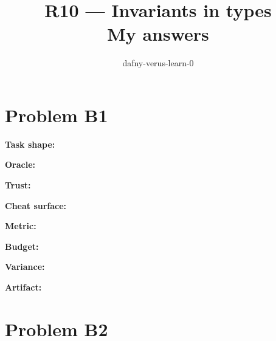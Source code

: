 \documentclass[11pt]{article}
\title{R10 --- Invariants in types \\ \large My answers}
\author{dafny-verus-learn-0}
\date{}
\begin{document}
\maketitle
\section*{Problem B1}\label{ans:B1}
\begin{answer}
\textbf{Task shape:} \vspace{1.3cm}

\textbf{Oracle:} \vspace{1.3cm}

\textbf{Trust:} \vspace{1.3cm}

\textbf{Cheat surface:} \vspace{1.3cm}

\textbf{Metric:} \vspace{1.3cm}

\textbf{Budget:} \vspace{1.3cm}

\textbf{Variance:} \vspace{1.3cm}

\textbf{Artifact:} \vspace{1.3cm}
\end{answer}
\section*{Problem B2}\label{ans:B2}
\begin{answer}\vspace{9cm}\end{answer}
\end{document}

